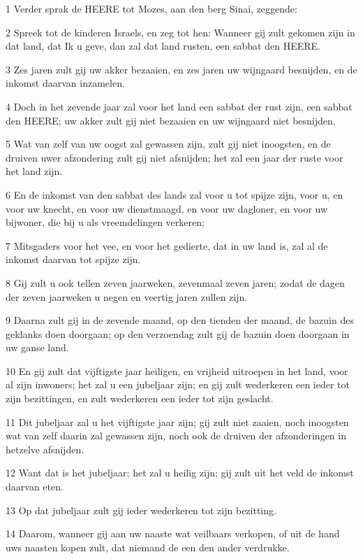 \par 1 Verder sprak de HEERE tot Mozes, aan den berg Sinai, zeggende:
\par 2 Spreek tot de kinderen Israels, en zeg tot hen: Wanneer gij zult gekomen zijn in dat land, dat Ik u geve, dan zal dat land rusten, een sabbat den HEERE.
\par 3 Zes jaren zult gij uw akker bezaaien, en zes jaren uw wijngaard besnijden, en de inkomst daarvan inzamelen.
\par 4 Doch in het zevende jaar zal voor het land een sabbat der rust zijn, een sabbat den HEERE; uw akker zult gij niet bezaaien en uw wijngaard niet besnijden.
\par 5 Wat van zelf van uw oogst zal gewassen zijn, zult gij niet inoogsten, en de druiven uwer afzondering zult gij niet afsnijden; het zal een jaar der ruste voor het land zijn.
\par 6 En de inkomst van den sabbat des lands zal voor u tot spijze zijn, voor u, en voor uw knecht, en voor uw dienstmaagd, en voor uw dagloner, en voor uw bijwoner, die bij u als vreemdelingen verkeren;
\par 7 Mitsgaders voor het vee, en voor het gedierte, dat in uw land is, zal al de inkomst daarvan tot spijze zijn.
\par 8 Gij zult u ook tellen zeven jaarweken, zevenmaal zeven jaren; zodat de dagen der zeven jaarweken u negen en veertig jaren zullen zijn.
\par 9 Daarna zult gij in de zevende maand, op den tienden der maand, de bazuin des geklanks doen doorgaan; op den verzoendag zult gij de bazuin doen doorgaan in uw ganse land.
\par 10 En gij zult dat vijftigste jaar heiligen, en vrijheid uitroepen in het land, voor al zijn inwoners; het zal u een jubeljaar zijn; en gij zult wederkeren een ieder tot zijn bezittingen, en zult wederkeren een ieder tot zijn geslacht.
\par 11 Dit jubeljaar zal u het vijftigste jaar zijn; gij zult niet zaaien, noch inoogsten wat van zelf daarin zal gewassen zijn, noch ook de druiven der afzonderingen in hetzelve afsnijden.
\par 12 Want dat is het jubeljaar; het zal u heilig zijn; gij zult uit het veld de inkomst daarvan eten.
\par 13 Op dat jubeljaar zult gij ieder wederkeren tot zijn bezitting.
\par 14 Daarom, wanneer gij aan uw naaste wat veilbaars verkopen, of uit de hand uws naasten kopen zult, dat niemand de een den ander verdrukke.
